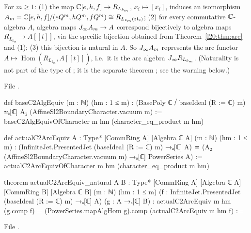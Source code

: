 \begin{theorem}\label{l20:thm:c2arc}
For $m\ge1$: (1) the map ${\mathbb{C}}[e,h,f]\to R_{L_{k_m}}$, $x_i\mapsto[\overline{x_i}]$, induces an isomorphism
$A_m={\mathbb{C}}[e,h,f]/(eQ^m,hQ^m,fQ^m)\cong R_{L_{k_m}(\mathfrak{sl}_2)}$; (2) for every commutative
${\mathbb{C}}$-algebra $A$, algebra maps $J_\infty A_m\to A$ correspond bijectively to algebra maps
$R_{L_{k_m}}\to A[[t]]$, via the specific bijection obtained from Theorem~\ref{l20:thm:arc} and (1); (3) this bijection is natural in $A$. So
$J_\infty A_m$ represents the arc functor $A\mapsto\operatorname{Hom}(R_{L_{k_m}},A[[t]])$, i.e.\ it is the arc algebra
$J_\infty R_{L_{k_m}}$. (Naturality is not part of the type of ; it is the separate theorem
; see the warning below.)
\end{theorem}
\noindent File .
\begin{leancode}
def baseC2AlgEquiv (m : ℕ) (hm : 1 ≤ m) :
    (BasePoly ℂ ⧸ baseIdeal (R := ℂ) m) ≃ₐ[ℂ] A₂ (AffineSl2BoundaryCharacter.vacuum m) :=
  baseC2AlgEquivOfCharacter m hm (character_eq_product m hm)

def actualC2ArcEquiv {A : Type*} [CommRing A] [Algebra ℂ A]
    (m : ℕ) (hm : 1 ≤ m) :
    (InfiniteJet.PresentedJet (baseIdeal (R := ℂ) m) →ₐ[ℂ] A) ≃
      (A₂ (AffineSl2BoundaryCharacter.vacuum m) →ₐ[ℂ] PowerSeries A) :=
  actualC2ArcEquivOfCharacter m hm (character_eq_product m hm)

theorem actualC2ArcEquiv_natural {A B : Type*} [CommRing A] [Algebra ℂ A]
    [CommRing B] [Algebra ℂ B] (m : ℕ) (hm : 1 ≤ m)
    (f : InfiniteJet.PresentedJet (baseIdeal (R := ℂ) m) →ₐ[ℂ] A) (g : A →ₐ[ℂ] B) :
    actualC2ArcEquiv m hm (g.comp f) = (PowerSeries.mapAlgHom g).comp (actualC2ArcEquiv m hm f) :=
\end{leancode}
\noindent File .
